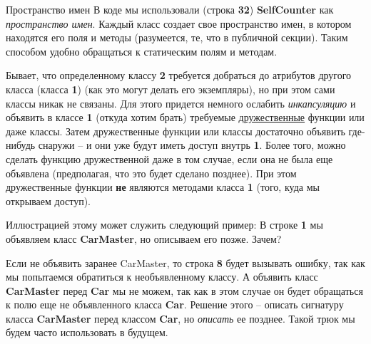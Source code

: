 \begin{lecture}[\lectureSubject]
\begin{lecSection}
			\begin{lecSubsection}{Пространство имен}
				В коде мы использовали (строка \textbf{32}) \textbf{SelfCounter} как \textit{пространство имен}. Каждый класс создает свое пространство имен, в котором находятся его поля и методы (разумеется, те, что в публичной секции). Таким способом удобно обращаться к статическим полям и методам.
			\end{lecSubsection}
		\end{lecSection}
		
		\begin{lecSection}
			Бывает, что определенному классу \textbf{2} требуется добраться до атрибутов другого класса (класса \textbf{1}) (как это могут делать его экземпляры), но при этом сами классы никак не связаны. Для этого придется немного ослабить \textit{инкапсуляцию} и объявить в классе \textbf{1} (откуда хотим брать) требуемые \underline{дружественные} функции или даже классы. Затем дружественные функции или классы достаточно объявить где-нибудь снаружи -- и они уже будут иметь доступ внутрь \textbf{1}. Более того, можно сделать функцию дружественной даже в том случае, если она не была еще объявлена (предполагая, что это будет сделано позднее). При этом дружественные функции \textbf{не} являются методами класса \textbf{1} (того, куда мы открываем доступ).
			
			Иллюстрацией этому может служить следующий пример:
			\newpage
			В строке \textbf{1} мы объявляем класс \textbf{CarMaster}, но описываем его позже. Зачем?
			
			Если не объявить заранее CarMaster, то строка \textbf{8} будет вызывать ошибку, так как мы попытаемся обратиться к необъявленному классу. А объявить класс \textbf{CarMaster} перед \textbf{Car} мы не можем, так как в этом случае он будет обращаться к полю еще не объявленного класса \textbf{Car}. Решение этого -- описать сигнатуру класса \textbf{CarMaster} перед классом \textbf{Car}, но \textit{описать} ее позднее. Такой трюк мы будем часто использовать в будущем.
		\end{lecSection}
\end{lecture}
